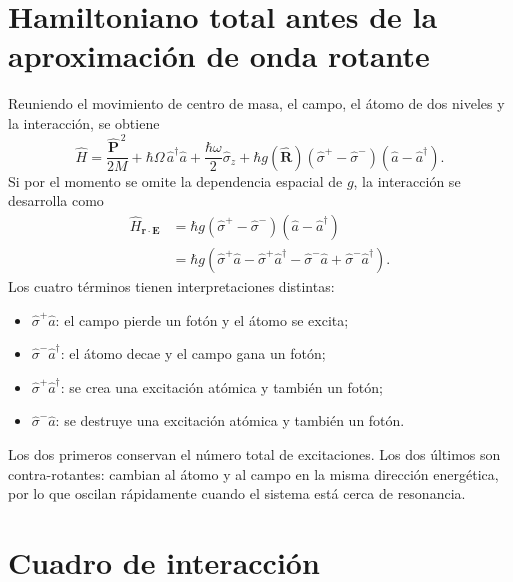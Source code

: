 \documentclass[11pt]{article}
\newcommand{\vb}[1]{\mathbf{#1}}
\newcommand{\adag}{\hat a^\dagger}
\newcommand{\splus}{\hat\sigma^+}
\newcommand{\sminus}{\hat\sigma^-}
\begin{document}
\section{Hamiltoniano total antes de la aproximaci\'on de onda rotante}

Reuniendo el movimiento de centro de masa, el campo, el \'atomo de dos niveles y
la interacci\'on, se obtiene
\begin{equation}
  \boxed{
  \hat H
  =
  \frac{\hat{\vb P}^{\,2}}{2M}
  +
  \hbar\Omega\,\adag\hat a
  +
  \frac{\hbar\omega}{2}\hat\sigma_z
  +
  \hbar g(\hat{\vb R})
  (\splus-\sminus)(\hat a-\adag).
  }
\end{equation}
Si por el momento se omite la dependencia espacial de \(g\), la interacci\'on se
desarrolla como
\begin{align}
  \hat H_{\vb r\cdot\vb E}
  &=
  \hbar g(\splus-\sminus)(\hat a-\adag)                                      \\
  &=
  \hbar g
  \left(
    \splus\hat a
    -
    \splus\adag
    -
    \sminus\hat a
    +
    \sminus\adag
  \right).
\end{align}
Los cuatro t\'erminos tienen interpretaciones distintas:
\begin{itemize}
  \item \(\splus\hat a\): el campo pierde un fot\'on y el \'atomo se excita;
  \item \(\sminus\adag\): el \'atomo decae y el campo gana un fot\'on;
  \item \(\splus\adag\): se crea una excitaci\'on at\'omica y tambi\'en un fot\'on;
  \item \(\sminus\hat a\): se destruye una excitaci\'on at\'omica y tambi\'en un
  fot\'on.
\end{itemize}
Los dos primeros conservan el n\'umero total de excitaciones. Los dos \'ultimos
son contra-rotantes: cambian al \'atomo y al campo en la misma direcci\'on
energ\'etica, por lo que oscilan r\'apidamente cuando el sistema est\'a cerca
de resonancia.

\section{Cuadro de interacci\'on}
\end{document}
